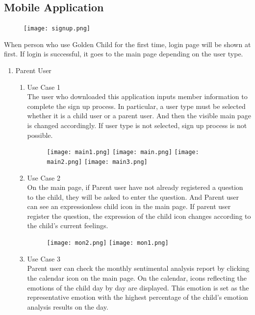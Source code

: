 \documentclass[conference]{IEEEtran}
\begin{document}
\subsection{Mobile Application}
\begin{figure}[H]
\centering
\texttt{[image: signup.png]}
\end{figure}
When person who use Golden Child for the first time, login page will be shown at first. If login is successful, it goes to the main page depending on the user type.
\begin{enumerate}
    \item Parent User
    \begin{enumerate}
        \begin{figure}[H]
        \centering
        \texttt{[image: signup2.png]}
        \texttt{[image: signup3.png]}
        \end{figure}
        \item Use Case 1 
        \\The user who downloaded this application inputs member information to complete the sign up process. In particular, a user type must be selected whether it is a child user or a parent user. And then the visible main page is changed accordingly. If user type is not selected, sign up process is not possible.
        \begin{figure}[H]
        \centering
        \texttt{[image: main1.png]}
        \texttt{[image: main.png]}
        \texttt{[image: main2.png]}
        \texttt{[image: main3.png]}
        \end{figure}
        \item Use Case 2
        \\On the main page, if Parent user have not already registered a question to the child, they will be asked to enter the question. And Parent user can see an expressionless child icon in the main page. If parent user register the question, the expression of the child icon changes according to the child's current feelings.
        \begin{figure}[H]
         \centering
         \texttt{[image: mon2.png]}
         \texttt{[image: mon1.png]}
         \end{figure}
        \item Use Case 3
        \\Parent user can check the monthly sentimental analysis report by clicking the calendar icon on the main page. On the calendar, icons reflecting the emotions of the child day by day are displayed. This emotion is set as the representative emotion with the highest percentage of the child's emotion analysis results on the day.

\end{enumerate}
\end{enumerate}
\end{document}
